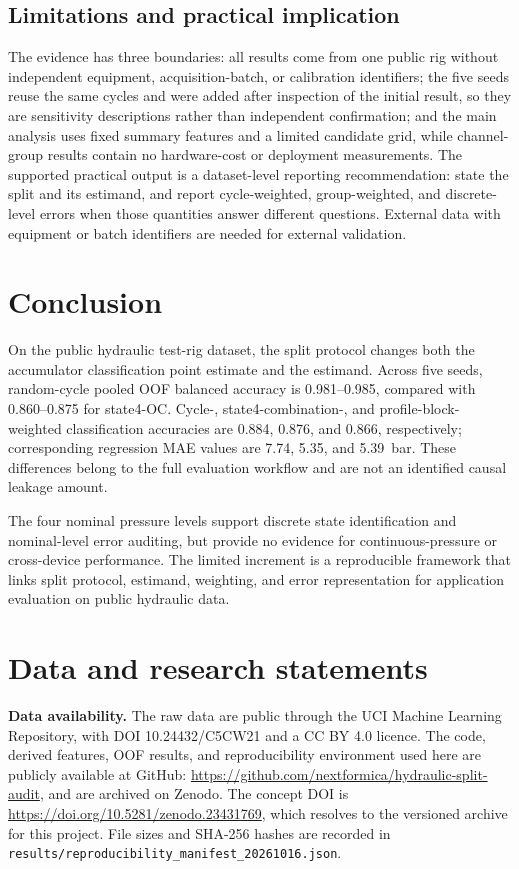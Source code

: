 \documentclass[11pt,a4paper]{article}
\begin{document}
\subsection{Limitations and practical implication}
The evidence has three boundaries: all results come from one public rig without independent equipment, acquisition-batch, or calibration identifiers; the five seeds reuse the same cycles and were added after inspection of the initial result, so they are sensitivity descriptions rather than independent confirmation; and the main analysis uses fixed summary features and a limited candidate grid, while channel-group results contain no hardware-cost or deployment measurements. The supported practical output is a dataset-level reporting recommendation: state the split and its estimand, and report cycle-weighted, group-weighted, and discrete-level errors when those quantities answer different questions. External data with equipment or batch identifiers are needed for external validation.

\section{Conclusion}
On the public hydraulic test-rig dataset, the split protocol changes both the accumulator classification point estimate and the estimand. Across five seeds, random-cycle pooled OOF balanced accuracy is 0.981--0.985, compared with 0.860--0.875 for state4-OC. Cycle-, state4-combination-, and profile-block-weighted classification accuracies are 0.884, 0.876, and 0.866, respectively; corresponding regression MAE values are 7.74, 5.35, and 5.39~bar. These differences belong to the full evaluation workflow and are not an identified causal leakage amount.

The four nominal pressure levels support discrete state identification and nominal-level error auditing, but provide no evidence for continuous-pressure or cross-device performance. The limited increment is a reproducible framework that links split protocol, estimand, weighting, and error representation for application evaluation on public hydraulic data.

\section*{Data and research statements}

\textbf{Data availability.} The raw data are public through the UCI Machine Learning Repository, with DOI 10.24432/C5CW21 and a CC BY 4.0 licence. The code, derived features, OOF results, and reproducibility environment used here are publicly available at GitHub: \url{https://github.com/nextformica/hydraulic-split-audit}, and are archived on Zenodo. The concept DOI is \url{https://doi.org/10.5281/zenodo.23431769}, which resolves to the versioned archive for this project. File sizes and SHA-256 hashes are recorded in \texttt{results/reproducibility\_manifest\_20261016.json}.
\end{document}

